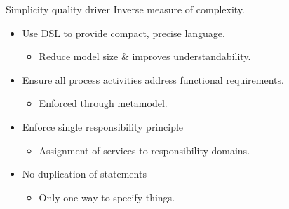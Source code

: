 \begin{frame}{Simplicity quality driver}
  Inverse measure of complexity.
  \begin{itemize}
    \item<+-| alert@+> Use DSL to provide compact, precise language.
		\begin{itemize}
		  \item Reduce model size \& improves understandability.
		\end{itemize}
	 \item<+-| alert@+> Ensure all process activities address functional requirements.
      \begin{itemize}
		  \item Enforced through metamodel.
      \end{itemize}
	 \item<+-| alert@+> Enforce single responsibility principle
		  \begin{itemize}
			 \item Assignment of services to responsibility domains.
		  \end{itemize}
	\item<+-| alert@+> No duplication of statements
		\begin{itemize}
		  \item Only one way to specify things.
      \end{itemize}
  \end{itemize}
\end{frame}


